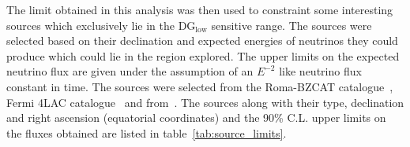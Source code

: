 

The limit obtained in this analysis was then used to constraint some interesting sources which exclusively lie in the DG$_{\text{low}}$ sensitive range. The sources were selected based on their declination and expected energies of neutrinos they could produce which could lie in the region explored. The upper limits on the expected neutrino flux are given under the assumption of an $E^{-2}$ like neutrino flux constant in time. The sources were selected from the Roma-BZCAT catalogue~\cite{Massaro:2008ye}, Fermi 4LAC catalogue~\cite{Ballet:2020hze} and from~\cite{Wakely:2007qpa}. The sources along with their type, declination and right ascension (equatorial coordinates) and the 90\% C.L. upper limits on the fluxes obtained are listed in table~\ref{tab:source_limits}. 

